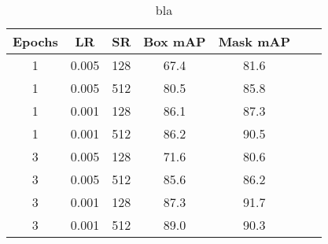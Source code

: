 \begin{table}
	\centering
	\caption[Detection evaluation]{bla}
	\label{tab:detection_eval2}
	\begin{tabular}[H!]{ccccccc}
		\toprule
		\textbf{Epochs} & \textbf{LR} & \textbf{SR} & \textbf{Box mAP} & \textbf{Mask mAP} \\
		\midrule
		1               & 0.005       & 128         & 67.4             & 81.6              \\
		1               & 0.005       & 512         & 80.5             & 85.8              \\
		1               & 0.001       & 128         & 86.1             & 87.3              \\
		1               & 0.001       & 512         & 86.2             & 90.5              \\
		3               & 0.005       & 128         & 71.6             & 80.6              \\
		3               & 0.005       & 512         & 85.6             & 86.2              \\
		3               & 0.001       & 128         & 87.3             & 91.7              \\
		3               & 0.001       & 512         & 89.0             & 90.3              \\
		\bottomrule
	\end{tabular}
\end{table}


